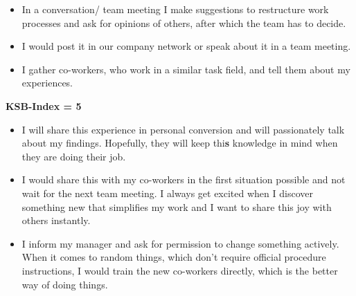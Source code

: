 \documentclass[twocolumn, serif, empirical, authordate]{jote-article}
\begin{document}
\begin{itemize} \item In a conversation/ team meeting I make suggestions to restructure work processes and ask for opinions of others, after which the team has to decide.
\item I would post it in our company network or speak about it in a team meeting.
\item I gather co-workers, who work in a similar task field, and tell them about my experiences.
\end{itemize} 

\textbf{KSB-Index = 5}

\begin{itemize} \item I will share this experience in personal conversion and will passionately talk about my findings. Hopefully, they will keep thi\textbf{s} knowledge in mind when they are doing their job.
\item I would share this with my co-workers in the first situation possible and not wait for the next team meeting. I always get excited when I discover something new that simplifies my work and I want to share this joy with others instantly.
\item I inform my manager and ask for permission to change something actively. When it comes to random things, which don't require official procedure instructions, I would train the new co-workers directly, which is the better way of doing things.
\end{itemize} 
\end{document}
